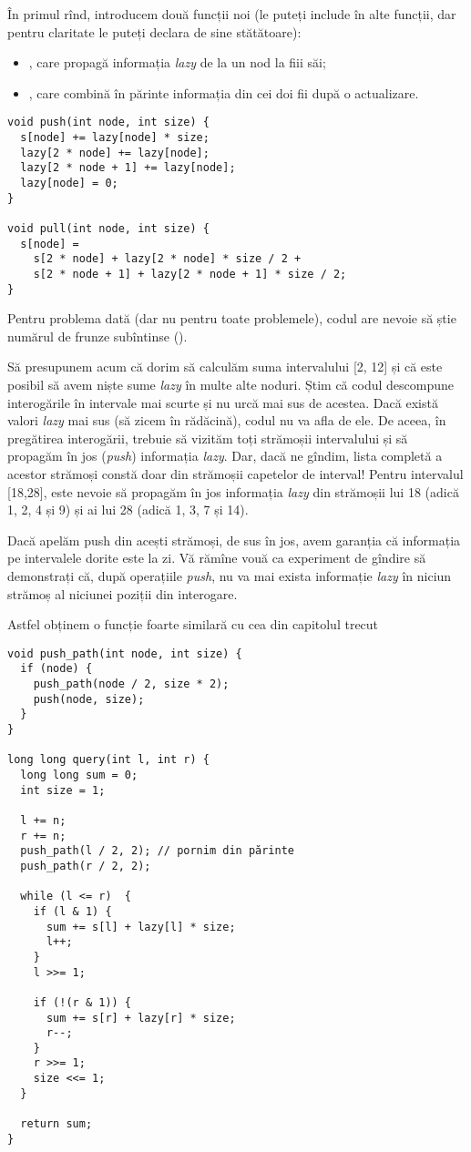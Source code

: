 În primul rînd, introducem două funcții noi (le puteți include în alte funcții, dar pentru claritate le puteți declara de sine stătătoare):

\begin{itemize}
  \item {}, care propagă informația \textit{lazy} de la un nod la fiii săi;
  \item {}, care combină în părinte informația din cei doi fii după o actualizare.
\end{itemize}

\begin{verbatim}
void push(int node, int size) {
  s[node] += lazy[node] * size;
  lazy[2 * node] += lazy[node];
  lazy[2 * node + 1] += lazy[node];
  lazy[node] = 0;
}

void pull(int node, int size) {
  s[node] =
    s[2 * node] + lazy[2 * node] * size / 2 +
    s[2 * node + 1] + lazy[2 * node + 1] * size / 2;
}
\end{verbatim}

Pentru problema dată (dar nu pentru toate problemele), codul are nevoie să știe numărul de frunze subîntinse ().

Să presupunem acum că dorim să calculăm suma intervalului [2, 12] și că este posibil să avem niște sume \textit{lazy} în multe alte noduri. Știm că codul descompune interogările în intervale mai scurte și nu urcă mai sus de acestea. Dacă există valori \textit{lazy} mai sus (să zicem în rădăcină), codul nu va afla de ele. De aceea, în pregătirea interogării, trebuie să vizităm toți strămoșii intervalului și să propagăm în jos (\textit{push}) informația \textit{lazy}. Dar, dacă ne gîndim, lista completă a acestor strămoși constă doar din strămoșii capetelor de interval! Pentru intervalul [18,28], este nevoie să propagăm în jos informația \textit{lazy} din strămoșii lui 18 (adică 1, 2, 4 și 9) și ai lui 28 (adică 1, 3, 7 și 14).

Dacă apelăm push din acești strămoși, de sus în jos, avem garanția că informația pe intervalele dorite este la zi. Vă rămîne vouă ca experiment de gîndire să demonstrați că, după operațiile \textit{push}, nu va mai exista informație \textit{lazy} în niciun strămoș al niciunei poziții din interogare.

Astfel obținem o funcție foarte similară cu cea din capitolul trecut

\begin{verbatim}
void push_path(int node, int size) {
  if (node) {
    push_path(node / 2, size * 2);
    push(node, size);
  }
}

long long query(int l, int r) {
  long long sum = 0;
  int size = 1;

  l += n;
  r += n;
  push_path(l / 2, 2); // pornim din părinte
  push_path(r / 2, 2);

  while (l <= r)  {
    if (l & 1) {
      sum += s[l] + lazy[l] * size;
      l++;
    }
    l >>= 1;

    if (!(r & 1)) {
      sum += s[r] + lazy[r] * size;
      r--;
    }
    r >>= 1;
    size <<= 1;
  }

  return sum;
}
\end{verbatim}

